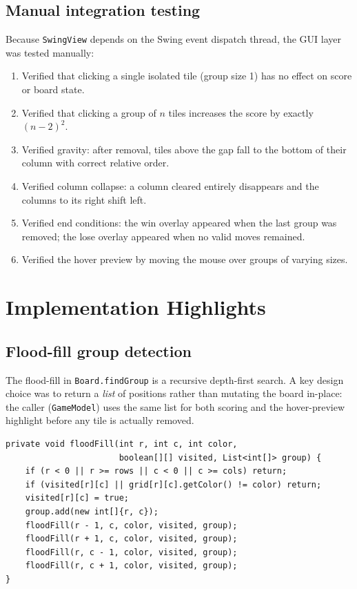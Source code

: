 \documentclass[12pt,a4paper]{article}
\begin{document}
\subsection{Manual integration testing}

Because \texttt{SwingView} depends on the Swing event dispatch thread, the
GUI layer was tested manually:

\begin{enumerate}
  \item Verified that clicking a single isolated tile (group size 1) has no
        effect on score or board state.
  \item Verified that clicking a group of \(n\) tiles increases the score by
        exactly $(n-2)^2$.
  \item Verified gravity: after removal, tiles above the gap fall to the bottom
        of their column with correct relative order.
  \item Verified column collapse: a column cleared entirely disappears and the
        columns to its right shift left.
  \item Verified end conditions: the win overlay appeared when the last group
        was removed; the lose overlay appeared when no valid moves remained.
  \item Verified the hover preview by moving the mouse over groups of varying
        sizes.
\end{enumerate}

\section{Implementation Highlights}
\label{sec:highlights}

\subsection{Flood-fill group detection}

The flood-fill in \texttt{Board.findGroup} is a recursive depth-first search.
A key design choice was to return a \emph{list} of positions rather than
mutating the board in-place: the caller (\texttt{GameModel}) uses the same
list for both scoring and the hover-preview highlight before any tile is
actually removed.

\begin{lstlisting}[caption={Recursive flood-fill in \texttt{Board.java}},
                   label={lst:floodfill}]
private void floodFill(int r, int c, int color,
                       boolean[][] visited, List<int[]> group) {
    if (r < 0 || r >= rows || c < 0 || c >= cols) return;
    if (visited[r][c] || grid[r][c].getColor() != color) return;
    visited[r][c] = true;
    group.add(new int[]{r, c});
    floodFill(r - 1, c, color, visited, group);
    floodFill(r + 1, c, color, visited, group);
    floodFill(r, c - 1, color, visited, group);
    floodFill(r, c + 1, color, visited, group);
}
\end{lstlisting}
\end{document}
